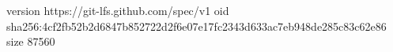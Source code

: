 version https://git-lfs.github.com/spec/v1
oid sha256:4cf2fb52b2d6847b852722d2f6e07e17fc2343d633ac7eb948de285c83c62e86
size 87560
